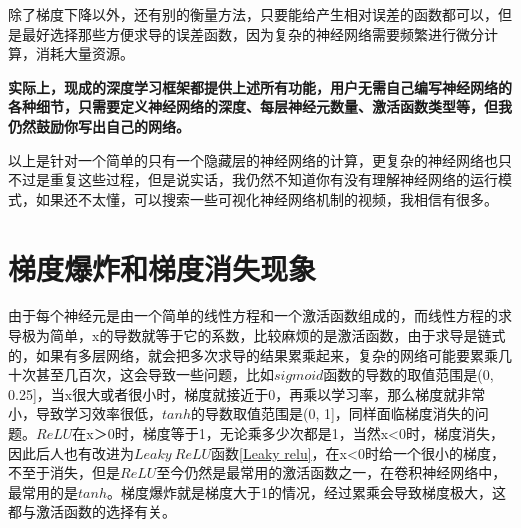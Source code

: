 \documentclass[a5paper, 11pt, openany]{book}
\begin{document}
除了梯度下降以外，还有别的衡量方法，只要能给产生相对误差的函数都可以，但是最好选择那些方便求导的误差函数，因为复杂的神经网络需要频繁进行微分计算，消耗大量资源。

\textbf{实际上，现成的深度学习框架都提供上述所有功能，用户无需自己编写神经网络的各种细节，只需要定义神经网络的深度、每层神经元数量、激活函数类型等，但我仍然鼓励你写出自己的网络。}

以上是针对一个简单的只有一个隐藏层的神经网络的计算，更复杂的神经网络也只不过是重复这些过程，但是说实话，我仍然不知道你有没有理解神经网络的运行模式，如果还不太懂，可以搜索一些可视化神经网络机制的视频，我相信有很多。

\section{梯度爆炸和梯度消失现象}

由于每个神经元是由一个简单的线性方程和一个激活函数组成的，而线性方程的求导极为简单，x的导数就等于它的系数，比较麻烦的是激活函数，由于求导是链式的，如果有多层网络，就会把多次求导的结果累乘起来，复杂的网络可能要累乘几十次甚至几百次，这会导致一些问题，比如$sigmoid$函数的导数的取值范围是(0, 0.25]，当x很大或者很小时，梯度就接近于0，再乘以学习率，那么梯度就非常小，导致学习效率很低，$tanh$的导数取值范围是(0, 1]，同样面临梯度消失的问题。$ReLU$在x＞0时，梯度等于1，无论乘多少次都是1，当然x<0时，梯度消失，因此后人也有改进为$Leaky~ReLU$函数\ref{Leaky relu}，在x<0时给一个很小的梯度，不至于消失，但是$ReLU$至今仍然是最常用的激活函数之一，在卷积神经网络中，最常用的是$tanh$。梯度爆炸就是梯度大于1的情况，经过累乘会导致梯度极大，这都与激活函数的选择有关。
\end{document}
